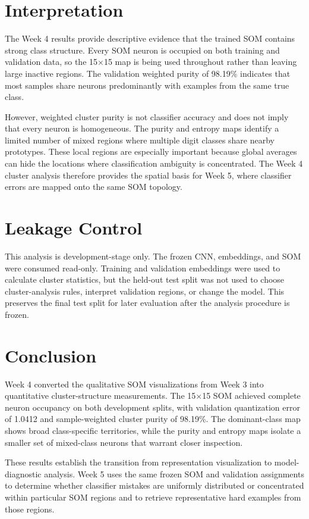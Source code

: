 \documentclass[11pt]{article}
\begin{document}
\section{Interpretation}
The Week 4 results provide descriptive evidence that the trained SOM contains strong class structure. Every SOM neuron is occupied on both training and validation data, so the 15$\times$15 map is being used throughout rather than leaving large inactive regions. The validation weighted purity of 98.19\% indicates that most samples share neurons predominantly with examples from the same true class.

However, weighted cluster purity is not classifier accuracy and does not imply that every neuron is homogeneous. The purity and entropy maps identify a limited number of mixed regions where multiple digit classes share nearby prototypes. These local regions are especially important because global averages can hide the locations where classification ambiguity is concentrated. The Week 4 cluster analysis therefore provides the spatial basis for Week 5, where classifier errors are mapped onto the same SOM topology.

\section{Leakage Control}
This analysis is development-stage only. The frozen CNN, embeddings, and SOM were consumed read-only. Training and validation embeddings were used to calculate cluster statistics, but the held-out test split was not used to choose cluster-analysis rules, interpret validation regions, or change the model. This preserves the final test split for later evaluation after the analysis procedure is frozen.

\section{Conclusion}
Week 4 converted the qualitative SOM visualizations from Week 3 into quantitative cluster-structure measurements. The 15$\times$15 SOM achieved complete neuron occupancy on both development splits, with validation quantization error of 1.0412 and sample-weighted cluster purity of 98.19\%. The dominant-class map shows broad class-specific territories, while the purity and entropy maps isolate a smaller set of mixed-class neurons that warrant closer inspection.

These results establish the transition from representation visualization to model-diagnostic analysis. Week 5 uses the same frozen SOM and validation assignments to determine whether classifier mistakes are uniformly distributed or concentrated within particular SOM regions and to retrieve representative hard examples from those regions.
\end{document}
